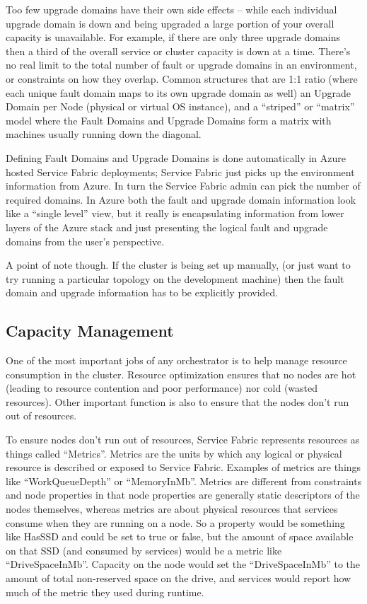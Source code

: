 Too few upgrade domains have their own side effects – while each
individual upgrade domain is down and being upgraded a large portion
of your overall capacity is unavailable. For example, if there are
only three upgrade domains then a third of the overall service or
cluster capacity is down at a time. There’s no real limit to the total
number of fault or upgrade domains in an environment, or constraints
on how they overlap. Common structures that are 1:1 ratio (where each
unique fault domain maps to its own upgrade domain as well) an Upgrade
Domain per Node (physical or virtual OS instance), and a “striped” or
“matrix” model where the Fault Domains and Upgrade Domains form a
matrix with machines usually running down the diagonal.

Defining Fault Domains and Upgrade Domains is done automatically in
Azure hosted Service Fabric deployments; Service Fabric just picks up
the environment information from Azure. In turn the Service Fabric
admin can pick the number of required domains. In Azure both the fault
and upgrade domain information look like a “single level” view, but it
really is encapsulating information from lower layers of the Azure
stack and just presenting the logical fault and upgrade domains from
the user’s perspective.

A point of note though. If the cluster is being set up manually, (or
just want to try running a particular topology on the development
machine) then the fault domain and upgrade information has to be
explicitly provided.

\subsection{Capacity Management}
One of the most important jobs of any orchestrator is to help manage
resource consumption in the cluster. Resource optimization ensures
that no nodes are hot (leading to resource contention and poor
performance) nor cold (wasted resources). Other important function is
also to ensure that the nodes don’t run out of resources.

To ensure nodes don’t run out of resources, Service Fabric represents
resources as things called “Metrics”. Metrics are the units by which
any logical or physical resource is described or exposed to Service
Fabric. Examples of metrics are things like “WorkQueueDepth” or
“MemoryInMb”. Metrics are different from constraints and node
properties in that node properties are generally static descriptors of
the nodes themselves, whereas metrics are about physical resources
that services consume when they are running on a node. So a property
would be something like HasSSD and could be set to true or false, but
the amount of space available on that SSD (and consumed by services)
would be a metric like “DriveSpaceInMb”. Capacity on the node would
set the “DriveSpaceInMb” to the amount of total non-reserved space on
the drive, and services would report how much of the metric they used
during runtime.

